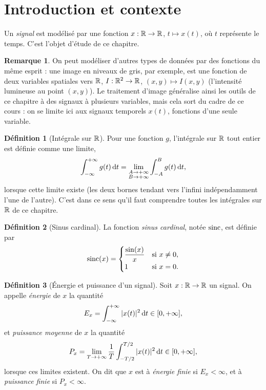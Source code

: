 \documentclass[a4paper,11pt]{article}
\title{\chapterTitle}
\author{}
\date{}
\makeatletter
\renewcommand\maketitle{{\raggedright\begin{center}
    {\Huge\bfseries\@title}
\end{center}}}
\theoremstyle{definition}
\newtheorem{definition}{Définition}[section]
\newtheorem{remark}{Remarque}[section]
\newcommand{\highlight}[1]{{\color{niceblue}\emph{#1}}}
\makeatother
\begin{document}
\selectfont
\fontsize{12pt}{14pt}\selectfont

\maketitle
\thispagestyle{fancy}

\section{Introduction et contexte}

Un \highlight{signal} est modélisé par une fonction $x:{\mathbb{R}}\to{\mathbb{R}}$, $t\mapsto x(t)$, où $t$ représente le temps. C'est l'objet d'étude de ce chapitre.

\begin{remark}
    On peut modéliser d'autres types de données par des fonctions du même esprit : une image en niveaux de gris, par exemple, est une fonction de deux variables spatiales vers ${\mathbb{R}}$, $I:{\mathbb{R}}^2\to{\mathbb{R}}$, $(x,y)\mapsto I(x,y)$ (l'intensité lumineuse au point $(x,y)$). Le traitement d'image généralise ainsi les outils de ce chapitre à des signaux à plusieurs variables, mais cela sort du cadre de ce cours : on se limite ici aux signaux temporels $x(t)$, fonctions d'une seule variable.
\end{remark}

\begin{definition}[Intégrale sur ${\mathbb{R}}$]
    Pour une fonction $g$, l'intégrale sur ${\mathbb{R}}$ tout entier est définie comme une limite,
    $$
        \int_{-\infty}^{+\infty} g(t)\,{\rm d} t = \lim_{\substack{A\to+\infty\\B\to+\infty}} \int_{-A}^{B} g(t)\,{\rm d} t,
    $$
    lorsque cette limite existe (les deux bornes tendant vers l'infini indépendamment l'une de l'autre). C'est dans ce sens qu'il faut comprendre toutes les intégrales sur ${\mathbb{R}}$ de ce chapitre.
\end{definition}

\begin{definition}[Sinus cardinal]
    La fonction \highlight{sinus cardinal}, notée $\operatorname{sinc}$, est définie par
    $$
        \operatorname{sinc}(x) = \begin{cases} \dfrac{\sin(x)}{x} & \text{si } x\neq0, \\ 1 & \text{si } x=0. \end{cases}
    $$
\end{definition}

\begin{definition}[Énergie et puissance d'un signal]
    \label{def:energie}
    Soit $x:{\mathbb{R}}\to{\mathbb{R}}$ un signal. On appelle \highlight{énergie} de $x$ la quantité
    $$
        E_x = \int_{-\infty}^{+\infty} |x(t)|^2\,{\rm d} t \in [0,+\infty],
    $$
    et \highlight{puissance moyenne} de $x$ la quantité
    $$
        P_x = \lim_{T\to+\infty} \frac1T\int_{-T/2}^{T/2} |x(t)|^2\,{\rm d} t \in [0,+\infty],
    $$
    lorsque ces limites existent. On dit que $x$ est à \highlight{énergie finie} si $E_x<\infty$, et à \highlight{puissance finie} si $P_x<\infty$.
\end{definition}
\end{document}
